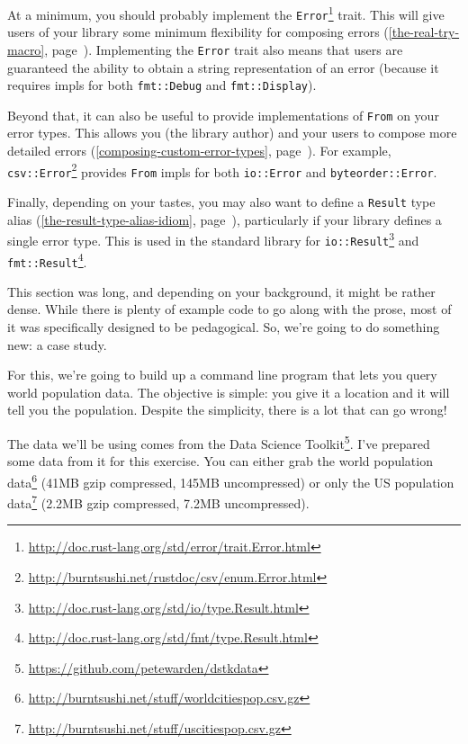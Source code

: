 \documentclass[a4paper,]{book}
\renewcommand*{\hyperref}[2][\ar]{%
  \def\ar{#2}%
  #2 (\autoref{#1}, page~\pageref{#1})}
\renewcommand{\href}[2]{#2\footnote{\url{#1}}}
\begin{document}
At a minimum, you should probably implement the
\href{http://doc.rust-lang.org/std/error/trait.Error.html}{\texttt{Error}}
trait. This will give users of your library some minimum flexibility for
\hyperref[the-real-try-macro]{composing errors}. Implementing the
\texttt{Error} trait also means that users are guaranteed the ability to
obtain a string representation of an error (because it requires impls
for both \texttt{fmt::Debug} and \texttt{fmt::Display}).

Beyond that, it can also be useful to provide implementations of
\texttt{From} on your error types. This allows you (the library author)
and your users to \hyperref[composing-custom-error-types]{compose more
detailed errors}. For example,
\href{http://burntsushi.net/rustdoc/csv/enum.Error.html}{\texttt{csv::Error}}
provides \texttt{From} impls for both \texttt{io::Error} and
\texttt{byteorder::Error}.

Finally, depending on your tastes, you may also want to define a
\hyperref[the-result-type-alias-idiom]{\texttt{Result} type alias},
particularly if your library defines a single error type. This is used
in the standard library for
\href{http://doc.rust-lang.org/std/io/type.Result.html}{\texttt{io::Result}}
and
\href{http://doc.rust-lang.org/std/fmt/type.Result.html}{\texttt{fmt::Result}}.


This section was long, and depending on your background, it might be
rather dense. While there is plenty of example code to go along with the
prose, most of it was specifically designed to be pedagogical. So, we're
going to do something new: a case study.

For this, we're going to build up a command line program that lets you
query world population data. The objective is simple: you give it a
location and it will tell you the population. Despite the simplicity,
there is a lot that can go wrong!

The data we'll be using comes from the
\href{https://github.com/petewarden/dstkdata}{Data Science Toolkit}.
I've prepared some data from it for this exercise. You can either grab
the \href{http://burntsushi.net/stuff/worldcitiespop.csv.gz}{world
population data} (41MB gzip compressed, 145MB uncompressed) or only the
\href{http://burntsushi.net/stuff/uscitiespop.csv.gz}{US population
data} (2.2MB gzip compressed, 7.2MB uncompressed).
\end{document}
